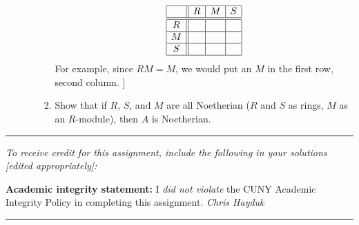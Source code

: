 \documentclass[11pt, reqno]{amsart}
\theoremstyle{plain}
\theoremstyle{definition}
\theoremstyle{example}
\begin{document}
\begin{enumerate}[1.]
\begin{enumerate}
\begin{enumerate}
{	$$\begin{array}{|c||c|c|c|}\hline&R&M&S\\\hline\hline R&&&\\\hline M&&&\\\hline S&&&\\\hline\end{array}$$
For example, since $RM = M$, we would put an $M$ in the first row, second column. 
]}
\item Show that if $R$, $S$, and $M$ are all Noetherian ($R$ and $S$ as rings, $M$ as an $R$-module), then $A$ is Noetherian.
\end{enumerate}

\end{enumerate}
\end{enumerate}

\vfill


\hrule
\emph{\small To receive credit for this assignment, include the following in your solutions [edited appropriately]:}

\smallskip

\textbf{Academic integrity statement:} I \emph{did not violate} the CUNY Academic Integrity Policy in completing this assignment. \hfill \emph{Chris Hayduk}

\medskip
\hrule

\vfill
\end{document}
